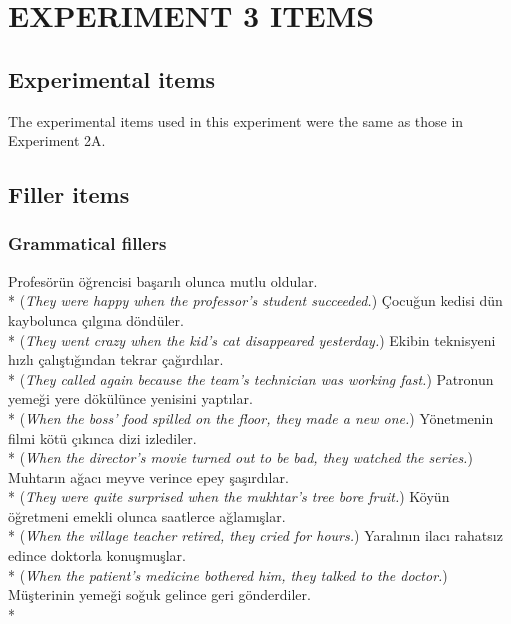 
\chapter{EXPERIMENT 3 ITEMS} \label{ap:exp3items}

\section{Experimental items}
The experimental items used in this experiment were the same as those in Experiment 2A. 

\section{Filler items}

\subsection{Grammatical fillers}
\ea Profes\"{o}r\"{u}n \"{o}\u{g}rencisi ba\c{s}ar{\i}l{\i} olunca mutlu oldular. \\*
({\it They were happy when the professor's student succeeded.})
\ex \c{C}ocu\u{g}un kedisi d\"{u}n kaybolunca \c{c}{\i}lg{\i}na d\"{o}nd\"{u}ler. \\*
({\it They went crazy when the kid's cat disappeared yesterday.})
\ex Ekibin teknisyeni h{\i}zl{\i} \c{c}al{\i}\c{s}t{\i}\u{g}{\i}ndan tekrar \c{c}a\u{g}{\i}rd{\i}lar. \\*
({\it They called again because the team's technician was working fast.})
\ex Patronun yeme\u{g}i yere d\"{o}k\"{u}l\"{u}nce yenisini yapt{\i}lar. \\*
({\it When the boss' food spilled on the floor, they made a new one.})
\ex Y\"{o}netmenin filmi k\"{o}t\"{u} \c{c}{\i}k{\i}nca dizi izlediler. \\*
({\it When the director's movie turned out to be bad, they watched the series.})
\ex Muhtar{\i}n a\u{g}ac{\i} meyve verince epey \c{s}a\c{s}{\i}rd{\i}lar. \\*
({\it They were quite surprised when the mukhtar's tree bore fruit.})
\ex K\"{o}y\"{u}n \"{o}\u{g}retmeni emekli olunca saatlerce a\u{g}lam{\i}\c{s}lar. \\*
({\it When the village teacher retired, they cried for hours.})
\ex Yaral{\i}n{\i}n ilac{\i} rahats{\i}z edince doktorla konu\c{s}mu\c{s}lar. \\*
({\it When the patient's medicine bothered him, they talked to the doctor.})
\ex M\"{u}\c{s}terinin yeme\u{g}i so\u{g}uk gelince geri g\"{o}nderdiler. \\*
